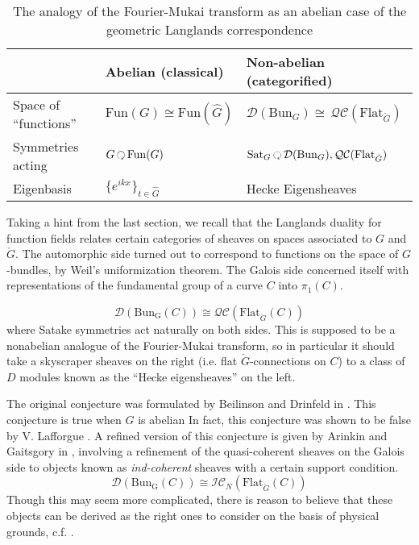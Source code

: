  
\begin{table}[h!]
	\centering
\begin{tabularx}{\textwidth}{|>{\hsize}Y|Y|>{\hsize}Y|}
	\hline
	& Abelian (classical) & Non-abelian (categorified)\\
	\hline
	Space of ``functions'' & $\mathrm{Fun}(G) \cong \mathrm{Fun}(\hat G)$ & $\mathcal D (\mathrm{Bun}_G) \cong \, \mathcal{QC}(\mathrm{Flat}_{\check G})$\\
	Symmetries acting & $G \lacts \mathrm{Fun}(G)$ & $\mathrm{Sat}_G \lacts \mathcal D (\mathrm{Bun}_G), \mathcal{QC}(\mathrm{Flat}_{\check G})$\\
	Eigenbasis & $\{e^{ikx}\}_{t \in \hat G}$ & Hecke Eigensheaves\\
	\hline
	\end{tabularx}
\caption{The analogy of the Fourier-Mukai transform as an abelian case of the geometric Langlands correspondence}
\label{tab:geometric_langlands}
\end{table}


Taking a hint from the last section, we recall that the Langlands duality for function fields relates certain categories of sheaves on spaces associated to $G$ and $\check G$. The automorphic side turned out to correspond to functions on the space of $G$-bundles, by Weil's uniformization theorem. The Galois side concerned itself with representations of the fundamental group of a curve $C$ into $\pi_1(C)$. 


\begin{equation}
	\mathcal D (\mathrm{Bun_G}(C)) \cong \mathcal{QC} (\mathrm{Flat}_{\check G} (C))
\end{equation}
where Satake symmetries act naturally on both sides. This is supposed to be a nonabelian analogue of the Fourier-Mukai transform, so in particular it should take a skyscraper sheaves on the right (i.e. flat $\check G$-connections on $C$) to a class of $D$ modules known as the ``Hecke eigensheaves'' on the left. 

The original conjecture was formulated by Beilinson and Drinfeld in \cite{beilinson1991}. This conjecture is true when $G$ is abelian 
In fact, this conjecture was shown to be false by V. Lafforgue \cite{lafforgue2009}.
A refined version of this conjecture is given by Arinkin and Gaitsgory in \cite{arinkin2015}, involving a refinement of the quasi-coherent sheaves on the Galois side to objects known as \emph{ind-coherent} sheaves with a certain support condition. 
\begin{equation}
	\mathcal D (\mathrm{Bun_G}(C)) \cong \mathcal{IC}_{N} (\mathrm{Flat}_{\check G} (C))
\end{equation}
Though this may seem more complicated, there is reason to believe that these objects can be derived as the right ones to consider on the basis of physical grounds, c.f. \cite{elliott2017}. 

